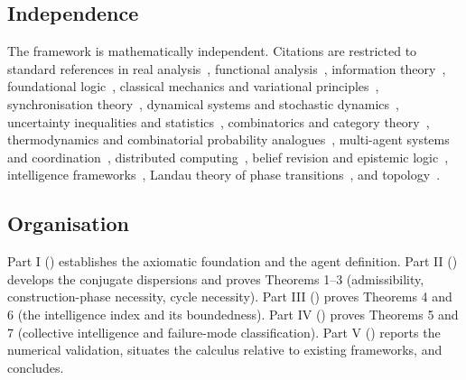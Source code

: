 \documentclass[11pt,twocolumn,a4paper]{article}
\begin{document}
\subsection{Independence}

The framework is mathematically independent. Citations are restricted to standard
references in real analysis~\cite{rudin1987,halmos1950}, functional
analysis~\cite{banach1922,koopman1931,stone1936},
information theory~\cite{shannon1948,coverthomas2006,kullback1951,fisher1925},
foundational logic~\cite{godel1931,tarski1933,turing1936,church1936,chaitin1974},
classical mechanics and variational principles~\cite{arnold1989,goldstein2002,onsager1953,
noether1918},
synchronisation theory~\cite{kuramoto1984,strogatz2000,acebron2005,pikovsky2001},
dynamical systems and stochastic dynamics~\cite{poincare1890,kramers1940,vankampen2007,
khalil2002},
uncertainty inequalities and statistics~\cite{heisenberg1927,robertson1929,rao1945,
cramer1946,lehmann2006,wasserman2004,kolmogorov1933},
combinatorics and category theory~\cite{andrews1976,stanley2011,maclane1998,birkhoff1967,
awodey2010,barrwells1990,howie1995},
thermodynamics and combinatorial probability analogues~\cite{boltzmann1877,landauer1961,
bennett1973,borel1909,cantelli1917},
multi-agent systems and coordination~\cite{vonneumannmorgenstern1944,nash1951,schelling1960,
aumann1976,lewis1969},
distributed computing~\cite{fischer1985,lamport1982,lynch1996,shoham2008},
belief revision and epistemic logic~\cite{alchourron1985,fagin1995},
intelligence frameworks~\cite{russellnorvig2020,legghutter2007,hutter2005,turing1950,
simon1996},
Landau theory of phase transitions~\cite{landau1937,landaulifshitz1980},
and topology~\cite{kelley1955,munkres2000}.

\subsection{Organisation}

Part I () establishes the axiomatic foundation and the agent
definition. Part II () develops the conjugate dispersions
and proves Theorems 1--3 (admissibility, construction-phase necessity, cycle necessity).
Part III () proves Theorems 4 and 6 (the intelligence index and
its boundedness). Part IV () proves Theorems 5 and 7
(collective intelligence and failure-mode classification). Part V
() reports the numerical validation,
situates the calculus relative to existing frameworks, and concludes.
\end{document}
